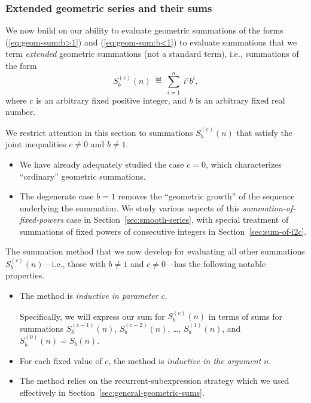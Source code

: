 \subsubsection{Extended geometric series and their sums}
\label{sec:extended-geom-series}

We now build on our ability to evaluate geometric summations of the forms (\ref{eq:geom-sum:b>1}) and (\ref{eq:geom-sum:b<1}) to evaluate summations that we term {\em extended} geometric summations (not a standard term), i.e., summations of the form
\[ S_b^{(c)}(n) \ \eqdef \ \sum_{i=1}^n \ i^c b^i, \]
where $c$ is an arbitrary fixed positive integer, and $b$ is an arbitrary fixed real number.

\smallskip

We restrict attention in this section to summations $S_b^{(c)}(n)$ that satisfy the joint inequalities $c \neq 0$ and $b \neq 1$.

\medskip

\begin{itemize}
\item
We have already adequately studied the case $c=0$, which characterizes ``ordinary'' geometric summations.
\item
The degenerate case $b = 1$ removes the ``geometric growth'' of the sequence underlying the summation.  We study various aspects of this {\it summation-of-fixed-powers} case in Section~\ref{sec:smooth-series}, with special treatment of summations of fixed powers of consecutive integers in Section~\ref{sec:sum-of-i2c}.
\end{itemize}

\medskip

The summation method that we now develop for evaluating all other summations $S_b^{(c)}(n)$---i.e., those with $b \neq 1$ and $c \neq 0$---has the following notable properties.
\begin{itemize}
\item
The method is {\em inductive in parameter} $c$.

\smallskip

Specifically, we will express our sum for $S_b^{(c)}(n)$ in terms of sums for summations $S_b^{(c-1)}(n)$, $S_b^{(c-2)}(n)$, \ldots, $S_b^{(1)}(n)$, and $S_b^{(0)}(n) = S_b(n)$.

\item
For each fixed value of $c$, the method is {\em inductive in the argument} $n$.

\item
The method relies on the recurrent-subexpression strategy which we used effectively in Section~\ref{sec:general-geometric-sums}.
\end{itemize}

